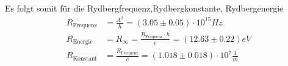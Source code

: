Es folgt somit für die Rydbergfrequenz,Rydbergkonstante, Rydbergenergie
\begin{align}
    R_{\text{Frequenz}}&=\frac{A^2}{h}=(3.05\pm 0.05)\cdot 10^{15}\si{Hz}\\
    R_{\text{Energie}}&=R_{\infty}=\frac{R_{\text{Frequenz}}\cdot h}{e}=(12.63\pm 0.22)\si{eV}\\
    R_{\text{Konstant}}&=\frac{R_{\text{Frequenz}}}{c}=(1.018\pm 0.018)\cdot 10^7\frac{1}{m}
\end{align}

\label{sec:Auswertung}
